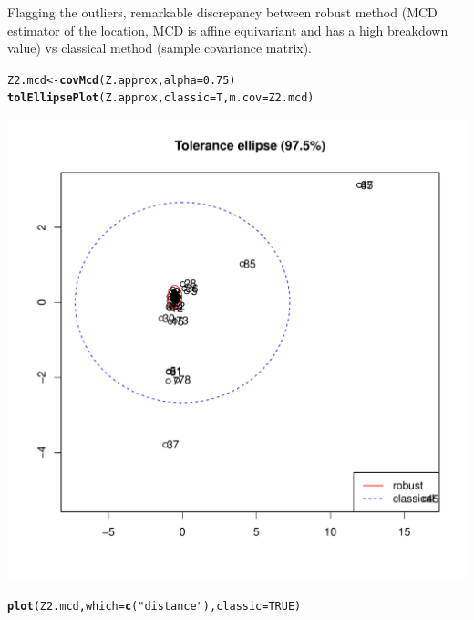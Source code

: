 \documentclass[a4paper,oneside,12pt,titlepage]{article}\usepackage[]{graphicx}\usepackage[]{color}
\makeatletter
\def\maxwidth{ %
  \ifdim\Gin@nat@width>\linewidth
    \linewidth
  \else
    \Gin@nat@width
  \fi
}
\newcommand{\hlnum}[1]{\textcolor[rgb]{0.686,0.059,0.569}{#1}}%
\newcommand{\hlstr}[1]{\textcolor[rgb]{0.192,0.494,0.8}{#1}}%
\newcommand{\hlstd}[1]{\textcolor[rgb]{0.345,0.345,0.345}{#1}}%
\newcommand{\hlkwb}[1]{\textcolor[rgb]{0.69,0.353,0.396}{#1}}%
\newcommand{\hlkwc}[1]{\textcolor[rgb]{0.333,0.667,0.333}{#1}}%
\newcommand{\hlkwd}[1]{\textcolor[rgb]{0.737,0.353,0.396}{\textbf{#1}}}%
\newenvironment{kframe}{%
 \def\at@end@of@kframe{}%
 \ifinner\ifhmode%
  \def\at@end@of@kframe{\end{minipage}}%
  \begin{minipage}{\columnwidth}%
 \fi\fi%
 \def\FrameCommand##1{\hskip\@totalleftmargin \hskip-\fboxsep
 \colorbox{shadecolor}{##1}\hskip-\fboxsep
     \hskip-\linewidth \hskip-\@totalleftmargin \hskip\columnwidth}%
 \MakeFramed {\advance\hsize-\width
   \@totalleftmargin\z@ \linewidth\hsize
   \@setminipage}}%
 {\par\unskip\endMakeFramed%
 \at@end@of@kframe}
\newenvironment{knitrout}{}{} %
\makeatother
\begin{document}
Flagging the outliers, remarkable discrepancy between robust method (MCD estimator of the location, MCD is affine equivariant and has a high breakdown value) vs classical method (sample covariance matrix). 
\begin{knitrout}
\color{fgcolor}\begin{kframe}
\begin{alltt}
\hlstd{Z2.mcd} \hlkwb{<-} \hlkwd{covMcd}\hlstd{(Z.approx,}\hlkwc{alpha} \hlstd{=} \hlnum{0.75}\hlstd{)}
\hlkwd{tolEllipsePlot}\hlstd{(Z.approx,}\hlkwc{classic} \hlstd{= T,}\hlkwc{m.cov} \hlstd{= Z2.mcd)}
\end{alltt}
\end{kframe}
\includegraphics[width=\maxwidth]{figure/unnamed-chunk-11-1} 
\begin{kframe}\begin{alltt}
\hlkwd{plot}\hlstd{(Z2.mcd,}\hlkwc{which} \hlstd{=} \hlkwd{c}\hlstd{(}\hlstr{"distance"}\hlstd{),}\hlkwc{classic} \hlstd{=} \hlnum{TRUE}\hlstd{)}
\end{alltt}
\end{kframe}

\end{knitrout}
\end{document}
